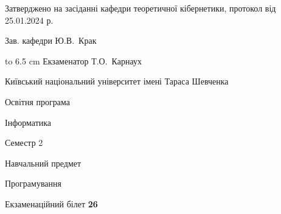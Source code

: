 \documentclass[12pt, ukrainian]{article}
\begin{document}
{\smallskip\smallskip \begin {scriptsize} Затверджено на засіданні кафедри теоретичної кібернетики, протокол   від   25.01.2024 р.\par\smallskip\smallskip\smallskip\smallskip
{\parbox {6.5 cm} {Зав. кафедри \dotfill Ю.В.~Крак}}\hspace {0.7cm} {\hbox to 6.5 cm { Екзаменатор \dotfill Т.О.~Карнаух}} \end{scriptsize}}
\newpage
{{\begin {scriptsize}\par
{ \center  Київський національний університет імені Тараса Шевченка \par}
{\parbox {5 cm}{Освітня програма \hfill}{\parbox {7 cm}{Інформатика\hfill}}\parbox {6 cm}{\hfill Семестр 2}}\par
{\parbox {5 cm} {Навчальний предмет \hfill}\parbox {7 cm}{Програмування \hfill}\parbox {6cm}{\hfill}\par}\vspace{-15pt} \end{scriptsize}}{\center Екзаменаційний білет \No \textbf { 26 }\par}}
\end{document}
